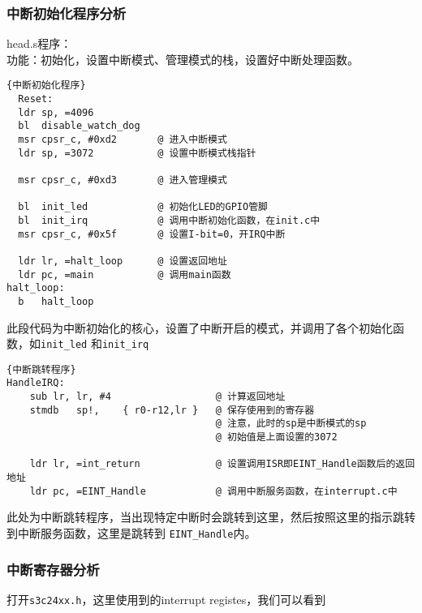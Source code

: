 \subsubsection{中断初始化程序分析}
head.s程序：\\
功能：初始化，设置中断模式、管理模式的栈，设置好中断处理函数。\\
\lstset{language=bash}
\begin{lstlisting}{中断初始化程序}
  Reset:                  
  ldr sp, =4096           
  bl  disable_watch_dog   
  msr cpsr_c, #0xd2       @ 进入中断模式
  ldr sp, =3072           @ 设置中断模式栈指针

  msr cpsr_c, #0xd3       @ 进入管理模式

  bl  init_led            @ 初始化LED的GPIO管脚
  bl  init_irq            @ 调用中断初始化函数，在init.c中
  msr cpsr_c, #0x5f       @ 设置I-bit=0，开IRQ中断
  
  ldr lr, =halt_loop      @ 设置返回地址
  ldr pc, =main           @ 调用main函数
halt_loop:
  b   halt_loop
\end{lstlisting}
此段代码为中断初始化的核心，设置了中断开启的模式，并调用了各个初始化函数，如\lstinline{init_led}
和\lstinline{init_irq}

\lstset{language=bash}
\begin{lstlisting}{中断跳转程序}
HandleIRQ:
    sub lr, lr, #4                  @ 计算返回地址
    stmdb   sp!,    { r0-r12,lr }   @ 保存使用到的寄存器
                                    @ 注意，此时的sp是中断模式的sp
                                    @ 初始值是上面设置的3072
    
    ldr lr, =int_return             @ 设置调用ISR即EINT_Handle函数后的返回地址  
    ldr pc, =EINT_Handle            @ 调用中断服务函数，在interrupt.c中
\end{lstlisting}
此处为中断跳转程序，当出现特定中断时会跳转到这里，然后按照这里的指示跳转到中断服务函数，这里是跳转到
\lstinline{EINT_Handle}内。

\subsubsection{中断寄存器分析}
打开\lstinline{s3c24xx.h}，这里使用到的interrupt registes，我们可以看到
\lstset{language=C}

